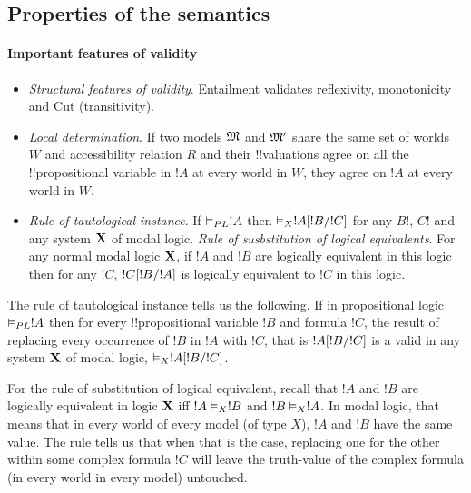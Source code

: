 \documentclass[../../../include/open-logic-section]{subfiles}
\begin{document}


\subsection{Properties of the semantics}


\paragraph*{Important features of validity}

\begin{itemize}
	\item \emph{Structural features of validity}. Entailment validates reflexivity, monotonicity and Cut (transitivity).
	\item \emph{Local determination}. If two models $\mModel{M}$ and $\mModel{M'}$ share the same set of worlds $W$ and accessibility relation $R$ and their !!{valuation}s agree on all the !!{propositional variable} in $!A$ at every world in $W$, they agree on $!A$ at every world in $W$.
	\item \emph{Rule of tautological instance}. If $\Entails[PL] !A$ then $\Entails[X] \Subst{!A}{!B}{!C}$ for any $B!$, $C!$ and any system $\Log X$ of modal logic.
	\emph{Rule of susbstitution of logical equivalents}. For any normal modal logic $\Log X$, if $!A$ and $!B$ are logically equivalent in this logic then for any $!C$, $!C[!B/!A]$ is logically equivalent to $!C$ in this logic.
\end{itemize}

The rule of tautological instance tells us the following. If in propositional logic $\Entails[PL] !A$ then for every !!{propositional variable} $!B$ and formula $!C$, the result of replacing every occurrence of $!B$ in $!A$ with $!C$, that is $!A[!B/!C]$ is a valid in any system $\Log X$ of modal logic, $\Entails[X] \Subst{!A}{!B}{!C}$.

For the rule of substitution of logical equivalent, recall that $!A$ and $!B$ are logically equivalent in logic $\Log X$ iff $!A \Entails[X] !B$ and $!B \Entails[X] !A$. In modal logic, that means that in every world of every model (of type $X$), $!A$ and $!B$ have the same value. The rule tells us that when that is the case, replacing one for the other within some complex formula $!C$ will leave the truth-value of the complex formula (in every world in every model) untouched. 
\end{document}
